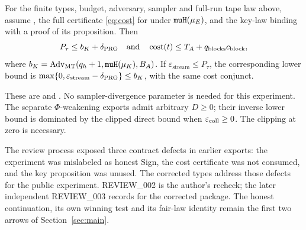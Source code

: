 \begin{theorem}\label{thm:public}
For the finite types, budget, adversary, sampler and full-run tape law
above, assume , the full certificate
\eqref{eq:cost} for  under $\code{muH}(\mu_E)$,
and the key-law binding with a proof of its proposition. Then
\[
 P_\tau\leq b_K+\delta_{\mathrm{PRG}}
 \quad\text{and}\quad
 \operatorname{cost}(t)\leq T_A+q_{\mathrm{blocks}}c_{\mathrm{block}},
\]
where $b_K=\Adv_{\mathrm{MT}}(q_h+1,\code{muH}(\mu_K),B_A)$.
If $\varepsilon_{\mathrm{stream}}\leq P_\tau$, the corresponding lower
bound is $\max\{0,\varepsilon_{\mathrm{stream}}-\delta_{\mathrm{PRG}}\}\leq b_K$,
with the same cost conjunct.
\end{theorem}
These are  and
. No sampler-divergence
parameter is needed for this experiment. The separate $\Phi$-weakening
exports admit arbitrary $D\geq0$; their inverse lower bound is
dominated by the clipped direct bound when $\varepsilon_{\mathrm{coll}}\geq0$.
The clipping at zero is necessary.

The review process exposed three contract defects in earlier exports:
the experiment was mislabeled as honest Sign, the cost certificate
was not consumed, and the key proposition was unused. The corrected
types address those defects for the public experiment. REVIEW\_002
is the author's recheck; the later independent REVIEW\_003 records
 for the corrected package. The honest continuation,
its own winning test and its fair-law identity remain the first two
arrows of Section~\ref{sec:main}.
